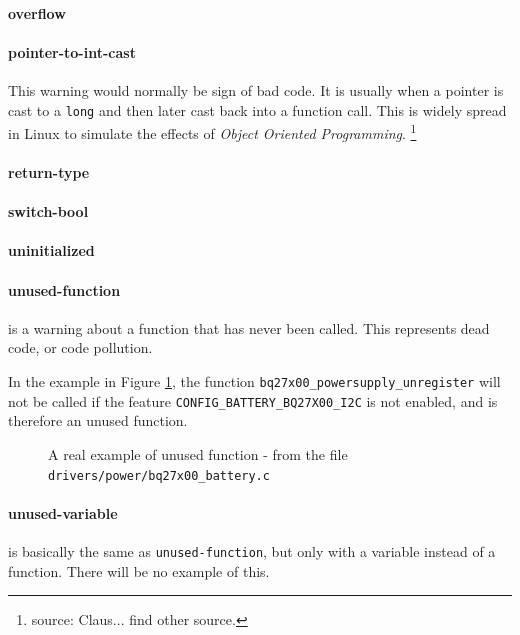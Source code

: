 \documentclass[a4paper,11pt]{report}
\newcommand{\figa}{
    \begin{figure}[!htpb]
    \centering
}
\newcommand{\figb}[2]{
    \caption{#1}
    \label{#2}
    \end{figure}
}
\begin{document}
            \paragraph{overflow}


            \paragraph{pointer-to-int-cast}
            \label{par:pointertoint}
This warning would normally be sign of bad code. It is usually when a pointer 
is cast to a \texttt{long} and then later cast back into a function call. This 
is widely spread in Linux to simulate the effects of \emph{Object Oriented 
Programming}.
    \footnote{source: Claus... find other source.}


            \paragraph{return-type}
            \paragraph{switch-bool}
            \paragraph{uninitialized}
            \paragraph{unused-function}
is a warning about a function that has never been called. This represents dead 
code, or code pollution. 

In the example in Figure \ref{lst:unusedfuncreal}, the function 
\texttt{bq27x00\_powersupply\_unregister} will not be called if the feature 
\texttt{CONFIG\_BATTERY\_BQ27X00\_I2C} is not enabled, and is therefore an 
unused function.

\figa
    
\figb{A real example of unused function - from the file 
    \texttt{drivers/power/bq27x00\_battery.c}}{lst:unusedfuncreal}


            \paragraph{unused-variable}
is basically the same as \texttt{unused-function}, but only with a variable 
instead of a function. There will be no example of this.
\end{document}
